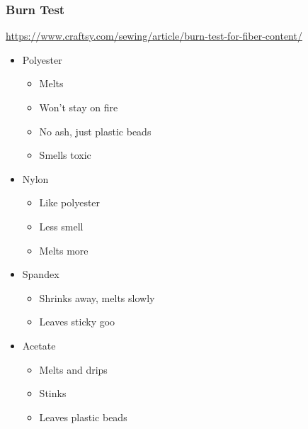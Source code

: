 \documentclass{beamer}
\begin{document}
\begin{frame}[fragile]
\frametitle{Burn Test}
\url{https://www.craftsy.com/sewing/article/burn-test-for-fiber-content/}
\begin{itemize}[<+(1)->]
\item Polyester
    \begin{itemize}
        \item Melts
        \item Won't stay on fire
        \item No ash, just plastic beads
        \item Smells toxic
    \end{itemize}
\item Nylon
    \begin{itemize}
        \item Like polyester
        \item Less smell
        \item Melts more
    \end{itemize}
\item Spandex
    \begin{itemize}
        \item Shrinks away, melts slowly
        \item Leaves sticky goo
    \end{itemize}
\item Acetate
    \begin{itemize}
        \item Melts and drips
        \item Stinks
        \item Leaves plastic beads
    \end{itemize}
\end{itemize}
\end{frame}
\end{document}
